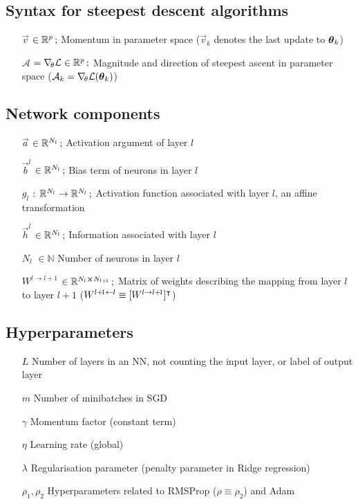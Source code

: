 \subsection*{Syntax for steepest descent algorithms}
\begin{itemize}
    \item[$\vec{v}$] $\in\RR[p]\, ;$ Momentum in parameter space ($\vec{v}_k$ denotes the last update to $\svec{\theta}_k$)
    \item[$\mathcal{A}$] $=\nabla_{\! \theta} \mathcal{L} \in\RR[p]\, ;$ Magnitude and direction of steepest ascent in parameter space ($\mathcal{A}_k = \nabla_{\! \theta} \mathcal{L}(\svec{\theta}_k)$)
\end{itemize}

\subsection*{Network components}
\begin{itemize}[leftmargin=3.8em]
    \item[$\vec{a}$] $\in\RR[N_l]\, ;$ Activation argument of layer $l$
    \item[$\vec{b}^l$] $\in \RR[N_l]\,;$ Bias term of neurons in layer $l$
    \item[$g_l$] $:\,\RR[N_l] \to\RR[N_{l}]\,;$ Activation function associated with layer $l$, an affine transformation
    \item[$\vec{h}^l$] $\in\RR[N_l]\, ;$ Information associated with layer $l$ 
    \item[$N_l$] $\in \mathbb{N}$ Number of neurons in layer $l$
    \item[$W^{l\to l+\! 1}$] $\in \RR[N_l \cross N_{l+\! 1}]\,;$ Matrix of weights describing the mapping from layer $l$ to layer $l+1$ ($W^{l+\! 1 \leftarrow l} \equiv [W^{l\to l+\! 1}]\TT$)
\end{itemize}

\subsection*{Hyperparameters}
\begin{itemize}[leftmargin=2.8em]
    \item[$L$] Number of layers in an NN, not counting the input layer, or label of output layer 
    \item[$m$] Number of minibatches in SGD
    \item[$\gamma$] Momentum factor (constant term)
    \item[$\eta$] Learning rate (global)
    \item[$\lambda$] Regularisation parameter (penalty parameter in Ridge regression)
    \item[$\rho_1, \rho_2$] Hyperparameters related to RMSProp ($\rho \equiv \rho_2$) and Adam
\end{itemize}

